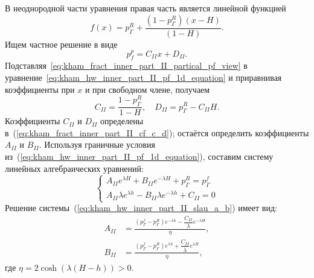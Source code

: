\documentclass{article}
\begin{document}
В неоднородной части уравнения правая часть является линейной функцией
\begin{equation}
	\displaystyle
	f\left(x\right) = p^R_{\Gamma} + \dfrac{\left( 1-p^R_{\Gamma}\right)\left(x-H\right)}{\left(1-H\right)}.
	\label{eq:kham_fract_inner_part_II_fx}
\end{equation}
Ищем частное решение в виде
\begin{equation}
	\displaystyle
	p_f^p = C_{II} x + D_{II}.
	\label{eq:kham_fract_inner_part_II_partical_pf_view}
\end{equation}
Подставляя~\eqref{eq:kham_fract_inner_part_II_partical_pf_view} в уравнение~\eqref{eq:kham_hw_inner_part_II_pf_1d_equation}
и приравнивая коэффициенты при $x$ и при свободном члене, получаем
\begin{equation}
	\displaystyle
	C_{II} = \dfrac{1-p^R_{\Gamma}}{1-H}, \quad
	D_{II} = p^R_{\Gamma} - C_{II} H.
	\label{eq:kham_fract_inner_part_II_cf_c_d}
\end{equation}
Коэффициенты $C_{II}$ и $D_{II}$ определены в~(\ref{eq:kham_fract_inner_part_II_cf_c_d}); остаётся определить коэффициенты $A_{II}$ и $B_{II}$.
Используя граничные условия из~(\ref{eq:kham_hw_inner_part_II_pf_1d_equation}), составим систему линейных алгебраических уравнений:
\begin{equation}
	\displaystyle
	\begin{cases}
		A_{II} e^{\lambda H} + B_{II} e^{-\lambda H} + p^R_{\Gamma} = p^f_{\Gamma} \\
		A_{II} \lambda e^{\lambda h} - B_{II} \lambda e^{-\lambda h} + C_{II} = 0
	\end{cases}
	\label{eq:kham_hw_inner_part_II_slau_a_b}
\end{equation}
Решение системы~(\ref{eq:kham_hw_inner_part_II_slau_a_b}) имеет вид:
\begin{equation}
	\displaystyle
	\begin{aligned}
		A_{II} & = \frac{\left(p^f_{\Gamma} - p^R_{\Gamma}\right) e^{- \lambda h} - \dfrac{C_{II}}{\lambda} e^{-\lambda H}}{\eta}, \\
		B_{II} & = \frac{\left(p^f_{\Gamma} - p^R_{\Gamma}\right) e^{\lambda h} + \dfrac{C_{II}}{\lambda} e^{\lambda H}}{\eta},
	\end{aligned}
	\label{eq:kham_hw_inner_part_II_a_b_slau_solution}
\end{equation}
где $\eta = 2 \cosh{\left(\lambda \left(H-h\right)\right)} > 0$.
\end{document}
